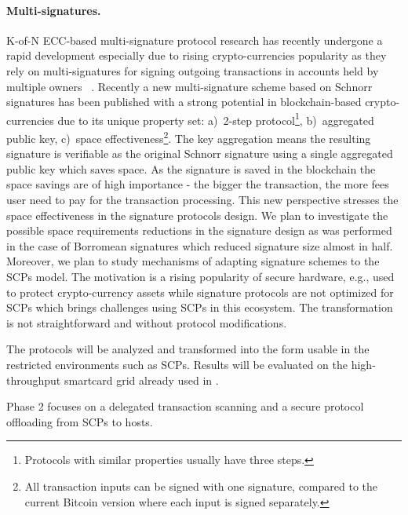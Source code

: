 \documentclass[
  digital, %
  twoside, %
  table,   %
  lof,     %
  lot,     %
]{fithesis3}
\newcounter{ph4_show_guides}
\theoremstyle{definition}
\theoremstyle{remark}
\begin{document}
\begin{ecmmnt}
\paragraph{Multi-signatures.} K-of-N ECC-based multi-signature protocol research has recently undergone a rapid development especially due to rising crypto-currencies popularity as they rely on multi-signatures for signing outgoing transactions in accounts held by multiple owners ~\cite{Bellare:2006:MPP:1180405.1180453, Bellare:2007:UAS:2394539.2394589, 10.1007/3-540-36288-6_3, cryptoeprint:2015:996, Bnz2017BulletproofsSP, cryptoeprint:2018:068}.
Recently a new multi-signature scheme \cite{cryptoeprint:2018:068} based on Schnorr signatures \cite{schnor-10.1007/3-540-46885-4_68} has been published with a strong potential in blockchain-based crypto-currencies due to its unique property set: 
a)~2-step protocol\footnote{Protocols with similar properties usually have three steps.}, b)~aggregated public key, c)~space effectiveness\footnote{All transaction inputs can be signed with one signature, compared to the current Bitcoin version where each input is signed separately.}. 
The key aggregation means the resulting signature is verifiable as the original Schnorr signature using a single aggregated public key which saves space. As the signature is saved in the blockchain the space savings are of high importance - the bigger the transaction, the more fees user need to pay for the transaction processing. This new perspective stresses the space effectiveness in the signature protocols design. We plan to investigate the possible space requirements reductions in the signature design as was performed in the case of Borromean signatures \cite{borromean} which reduced signature size almost in half. Moreover, we plan to study mechanisms of adapting signature schemes to the SCPs model. The motivation is a rising popularity of secure hardware, e.g., used to protect crypto-currency assets while signature protocols are not optimized for SCPs which brings challenges using SCPs in this ecosystem. The transformation is not straightforward and without protocol modifications.


The protocols will be analyzed and transformed into the form usable in the restricted environments such as SCPs. Results will be evaluated on the high-throughput smartcard grid already used in \cite{2017-ccs-mavroudis}. 


Phase 2 focuses on a delegated transaction scanning and a secure protocol offloading from SCPs to hosts.
 

\end{ecmmnt}
\end{document}
